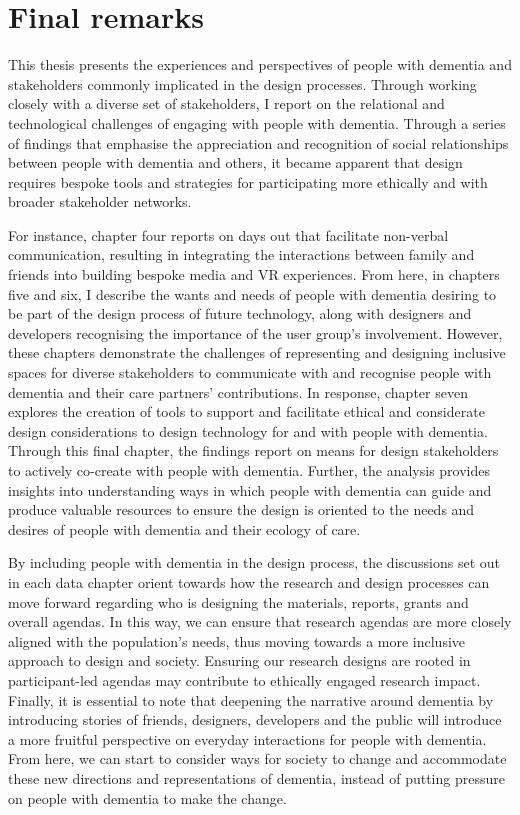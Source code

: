 \section{Final remarks}
\label{Discussion:FinalRemarks}
This thesis presents the experiences and perspectives of people with dementia and stakeholders commonly implicated in the design processes. Through working closely with a diverse set of stakeholders, I report on the relational and technological challenges of engaging with people with dementia. Through a series of findings that emphasise the appreciation and recognition of social relationships between people with dementia and others, it became apparent that design requires bespoke tools and strategies for participating more ethically and with broader stakeholder networks.

For instance, chapter four reports on days out that facilitate non-verbal communication, resulting in integrating the interactions between family and friends into building bespoke media and VR experiences. From here, in chapters five and six, I describe the wants and needs of people with dementia desiring to be part of the design process of future technology, along with designers and developers recognising the importance of the user group's involvement. However, these chapters demonstrate the challenges of representing and designing inclusive spaces for diverse stakeholders to communicate with and recognise people with dementia and their care partners' contributions. In response, chapter seven explores the creation of tools to support and facilitate ethical and considerate design considerations to design technology for and with people with dementia. Through this final chapter, the findings report on means for design stakeholders to actively co-create with people with dementia. Further, the analysis provides insights into understanding ways in which people with dementia can guide and produce valuable resources to ensure the design is oriented to the needs and desires of people with dementia and their ecology of care.

By including people with dementia in the design process, the discussions set out in each data chapter orient towards how the research and design processes can move forward regarding who is designing the materials, reports, grants and overall agendas. In this way, we can ensure that research agendas are more closely aligned with the population's needs, thus moving towards a more inclusive approach to design and society. Ensuring our research designs are rooted in participant-led agendas may contribute to ethically engaged research impact. Finally, it is essential to note that deepening the narrative around dementia by introducing stories of friends, designers, developers and the public will introduce a more fruitful perspective on everyday interactions for people with dementia. From here, we can start to consider ways for society to change and accommodate these new directions and representations of dementia, instead of putting pressure on people with dementia to make the change.



